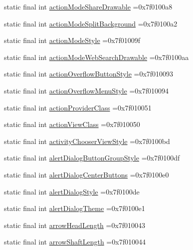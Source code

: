 \begin{DoxyCompactItemize}
static final int \hyperlink{classcheck_1_1test_1_1_r_1_1attr_ac472f4499bff65d116305db33c9635a7}{action\+Mode\+Share\+Drawable} =0x7f0100a8
\item 
static final int \hyperlink{classcheck_1_1test_1_1_r_1_1attr_ab54b0e4c2777d73f47b3f7d655ecc84e}{action\+Mode\+Split\+Background} =0x7f0100a2
\item 
static final int \hyperlink{classcheck_1_1test_1_1_r_1_1attr_a5b076a6be691781155b6fd38363e01aa}{action\+Mode\+Style} =0x7f01009f
\item 
static final int \hyperlink{classcheck_1_1test_1_1_r_1_1attr_afa8798d214b16417489dd4868015a948}{action\+Mode\+Web\+Search\+Drawable} =0x7f0100aa
\item 
static final int \hyperlink{classcheck_1_1test_1_1_r_1_1attr_a79f86eddf8f5ddb696413fb8240e9978}{action\+Overflow\+Button\+Style} =0x7f010093
\item 
static final int \hyperlink{classcheck_1_1test_1_1_r_1_1attr_adf07fdf83e0f7e3666ca3c62d9051738}{action\+Overflow\+Menu\+Style} =0x7f010094
\item 
static final int \hyperlink{classcheck_1_1test_1_1_r_1_1attr_acf3e8e893c96f1ce1d297389b1eaf8af}{action\+Provider\+Class} =0x7f010051
\item 
static final int \hyperlink{classcheck_1_1test_1_1_r_1_1attr_aabc7490f827174f67e409de2dd06c2cb}{action\+View\+Class} =0x7f010050
\item 
static final int \hyperlink{classcheck_1_1test_1_1_r_1_1attr_a112293f577f9e7451b663966a7cabb2b}{activity\+Chooser\+View\+Style} =0x7f0100bd
\item 
static final int \hyperlink{classcheck_1_1test_1_1_r_1_1attr_abc36e528bd90cfdb9882099faa4fe301}{alert\+Dialog\+Button\+Group\+Style} =0x7f0100df
\item 
static final int \hyperlink{classcheck_1_1test_1_1_r_1_1attr_a6bc9e9d1de7ab7695441b316c871825c}{alert\+Dialog\+Center\+Buttons} =0x7f0100e0
\item 
static final int \hyperlink{classcheck_1_1test_1_1_r_1_1attr_a266f3305ed6d39e276ec791931594f34}{alert\+Dialog\+Style} =0x7f0100de
\item 
static final int \hyperlink{classcheck_1_1test_1_1_r_1_1attr_a84ef9b5b92050e30d524366c5ea5bee4}{alert\+Dialog\+Theme} =0x7f0100e1
\item 
static final int \hyperlink{classcheck_1_1test_1_1_r_1_1attr_aea9df94f1b7f07026ded34d24018677d}{arrow\+Head\+Length} =0x7f010043
\item 
static final int \hyperlink{classcheck_1_1test_1_1_r_1_1attr_a42ef32908e93c3a8cc585d62eb217255}{arrow\+Shaft\+Length} =0x7f010044

\end{DoxyCompactItemize}
